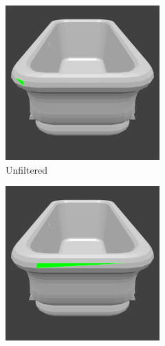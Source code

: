 \begin{figure}
	\centering
	\begin{subfigure}{.32\textwidth}
		\centering
		\includegraphics[width=\textwidth]{images/face_area_unfiltered.png}
		\caption{Unfiltered}
		\label{fig:face-area-unfiltered}
	\end{subfigure}
	\begin{subfigure}{.32\textwidth}
		\centering
		\includegraphics[width=\textwidth]{images/face_area_mean.png}

\end{subfigure}
\end{figure}
